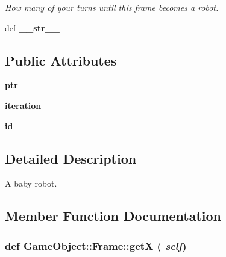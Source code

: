 \begin{DoxyCompactItemize}
\begin{DoxyCompactList}\small\item\em How many of your turns until this frame becomes a robot. \item\end{DoxyCompactList}\item 
\hypertarget{classGameObject_1_1Frame_aa6ad405de5401e9693cd83f83cc914e0}{
def {\bfseries \_\-\_\-str\_\-\_\-}}
\label{classGameObject_1_1Frame_aa6ad405de5401e9693cd83f83cc914e0}

\end{DoxyCompactItemize}
\subsection*{Public Attributes}
\begin{DoxyCompactItemize}
\item 
\hypertarget{classGameObject_1_1Frame_a8f947810e6ff714e270340b2927a2146}{
{\bfseries ptr}}
\label{classGameObject_1_1Frame_a8f947810e6ff714e270340b2927a2146}

\item 
\hypertarget{classGameObject_1_1Frame_a5e1552bc29afc173297363fb4825d018}{
{\bfseries iteration}}
\label{classGameObject_1_1Frame_a5e1552bc29afc173297363fb4825d018}

\item 
\hypertarget{classGameObject_1_1Frame_a920b0de70d007f5f6cd5a1a71c7741cb}{
{\bfseries id}}
\label{classGameObject_1_1Frame_a920b0de70d007f5f6cd5a1a71c7741cb}

\end{DoxyCompactItemize}


\subsection{Detailed Description}
A baby robot. 

\subsection{Member Function Documentation}
\hypertarget{classGameObject_1_1Frame_aab513e4859fc8a9f5d5f1a6b47cb6df3}{
\subsubsection[{getX}]{\setlength{\rightskip}{0pt plus 5cm}def GameObject::Frame::getX ( {\em self})}}
\label{classGameObject_1_1Frame_aab513e4859fc8a9f5d5f1a6b47cb6df3}


